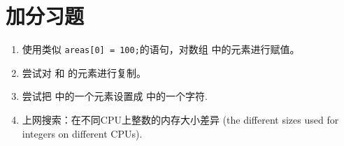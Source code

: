 \section{加分习题}

\begin{enumerate}
\item 使用类似 \verb|areas[0] = 100;|的语句，对数组  中的元素进行赋值。
\item 尝试对  和  的元素进行复制。
\item 尝试把  中的一个元素设置成  中的一个字符.
\item 上网搜索：在不同CPU上整数的内存大小差异 (the different sizes used for integers on different CPUs).
\end{enumerate}


